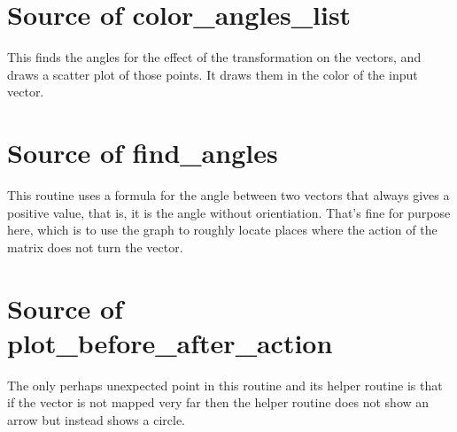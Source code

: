 \section{Source of color\_angles\_list}
This finds the angles for the effect of the transformation on the vectors,
and draws a scatter plot of those points.
It draws them in the color of the input vector.


\section{Source of find\_angles}
This routine uses a formula for the angle between two vectors that 
always gives a positive value, that is, it is the angle without orientiation.
That's fine for purpose here, which is to use the graph to 
roughly locate places where the action of the matrix does not turn the
vector. 



\section{Source of plot\_before\_after\_action}
The only perhaps unexpected point in this routine and its helper routine
is that if the vector is not mapped very far then the helper
routine does not show an arrow but instead shows a circle.



\endinput

TODO

1) Does python intro show 
   > x, y = 5, 7
construct?